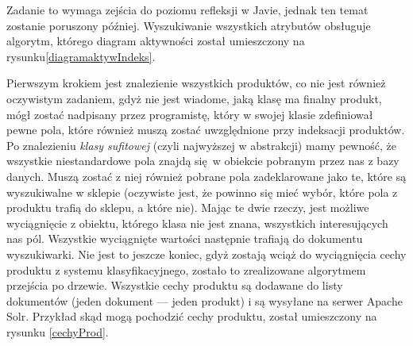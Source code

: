 Zadanie to wymaga zejścia do poziomu refleksji w Javie, jednak ten temat zostanie poruszony później. Wyszukiwanie wszystkich atrybutów obsługuje algorytm, którego diagram aktywności został umieszczony na rysunku\ref{diagramaktywIndeks}.

Pierwszym krokiem jest znalezienie wszystkich produktów, co nie jest również oczywistym zadaniem, gdyż nie jest wiadome, jaką klasę ma finalny produkt, mógł zostać nadpisany przez programistę, który w swojej klasie zdefiniował pewne pola, które również muszą zostać uwzględnione przy indeksacji produktów. Po znalezieniu \textit{klasy sufitowej} (czyli najwyższej w abstrakcji) mamy pewność, że wszystkie niestandardowe pola znajdą się w obiekcie pobranym przez nas z bazy danych. Muszą zostać z niej również pobrane pola zadeklarowane jako te, które są wyszukiwalne w sklepie (oczywiste jest, że powinno się mieć wybór, które pola z produktu trafią do sklepu, a które nie). Mając te dwie rzeczy, jest możliwe wyciągnięcie z obiektu, którego klasa nie jest znana, wszystkich interesujących nas pól. Wszystkie wyciągnięte wartości następnie trafiają do dokumentu wyszukiwarki. Nie jest to jeszcze koniec, gdyż zostają wciąż do wyciągnięcia cechy produktu z systemu klasyfikacyjnego, zostało to zrealizowane algorytmem przejścia po drzewie. Wszystkie cechy produktu są dodawane do listy dokumentów (jeden dokument — jeden produkt) i są wysyłane na serwer Apache Solr. Przykład skąd mogą pochodzić cechy produktu, został umieszczony na rysunku \ref{cechyProd}.
